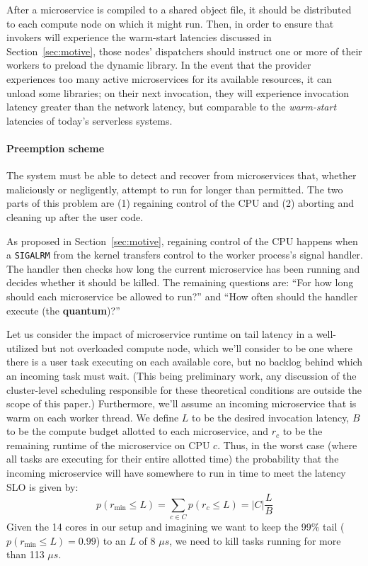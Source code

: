 After a microservice is compiled to a shared object file, it should be distributed to
each compute node on which it might run.  Then, in order to ensure that invokers will
experience the warm-start latencies discussed in Section~\ref{sec:motive}, those
nodes' dispatchers should instruct one or more of their workers to preload the
dynamic library.  In the event that the provider experiences too many active
microservices for its available resources, it can unload some libraries; on their
next invocation, they will experience invocation latency greater than the network
latency, but comparable to the \textit{warm-start} latencies of today's serverless
systems.

\paragraph{Preemption scheme}
The system must be able to detect and recover from microservices that, whether
maliciously or negligently, attempt to run for longer than permitted.  The two parts
of this problem are (1) regaining control of the CPU and (2) aborting and cleaning up
after the user code.

As proposed in Section~\ref{sec:motive}, regaining control of the CPU happens when a
\texttt{SIGALRM} from the kernel transfers control to the worker process's signal
handler.  The handler then checks how long the current microservice has been running
and decides whether it should be killed.  The remaining questions are:  ``For how
long should each microservice be allowed to run?'' and ``How often should the handler
execute (the \textbf{quantum})?''

Let us consider the impact of microservice runtime on tail latency in a well-utilized
but not overloaded compute node, which we'll consider to be one where there is a user
task executing on each available core, but no backlog behind which an incoming task
must wait.  (This being preliminary work, any discussion of the cluster-level
scheduling responsible for these theoretical conditions are outside the scope of
this paper.)  Furthermore, we'll assume an incoming microservice that is warm on each
worker thread.  We define $L$ to be the desired invocation latency, $B$ to be the
compute budget allotted to each microservice, and $r_c$ to be the remaining runtime
of the microservice on CPU $c$.  Thus, in the worst case (where all tasks are
executing for their entire allotted time) the probability that the incoming
microservice will have somewhere to run in time to meet the latency SLO is given by:
\begin{equation}
p(r_\textrm{min} \le L) = \sum\limits_{c \in C} p(r_c \le L) = \big| C \big| \frac{L}{B}
\end{equation}
Given the 14 cores in our setup and imagining we want to keep the 99\% tail
($p(r_\textrm{min} \le L) = 0.99$) to an $L$ of 8 $\mu{}s$, we need to kill tasks
running for more than 113 $\mu{}s$.

